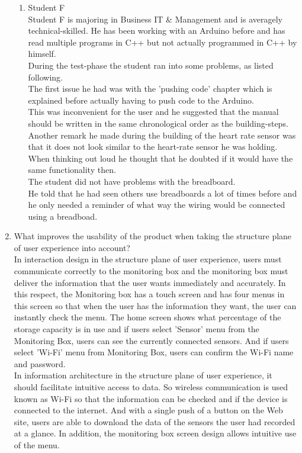 \documentclass[conference]{IEEEtran}
\begin{document}
\begin{enumerate}
\begin{enumerate}
					\item Student F\\
					Student F is majoring in Business IT \& Management and is averagely technical-skilled. He has been working with an Arduino before and has read multiple programs in C++ but not actually programmed in C++ by himself.\\
					During the test-phase the student ran into some problems, as listed following.\\
					The first issue he had was with the 'pushing code' chapter which is explained before actually having to push code to the Arduino.\\ 
					This was inconvenient for the user and he suggested that the manual should be written in the same chronological order as the building-steps.\\
					Another remark he made during the building of the heart rate sensor was that it does not look similar to the heart-rate sensor he was holding. \\
When thinking out loud he thought that he doubted if it would have the same functionality then.\\
The student did not have problems with the breadboard.\\
He told that he had seen others use breadboards a lot of times before and he only needed a reminder of what way the wiring would be connected using a breadboad.
				\end{enumerate}
				\newpage

			\item What improves the usability of the product when taking the structure plane of user experience into account?\\

				In interaction design in the structure plane of user experience, users must communicate correctly to the monitoring box and the monitoring box must deliver the information that the user wants immediately and accurately. In this respect, the Monitoring box has a touch screen and has four menus in this screen so that when the user has the information they want, the user can instantly check the menu. The home screen shows what percentage of the storage capacity is in use and if users select 'Sensor' menu from the Monitoring Box, users can see the currently connected sensors. And if users select 'Wi-Fi' menu from Monitoring Box, users can confirm the Wi-Fi name and password.\\
				In information architecture in the structure plane of user experience, it should facilitate intuitive access to data. So wireless communication is used known as Wi-Fi so that the information can be checked and if the device is connected to the internet. And with a single push of a button on the Web site, users are able to download the data of the sensors the user had recorded at a glance. In addition, the monitoring box screen design allows intuitive use of the menu.
\\


\end{enumerate}
\end{document}
